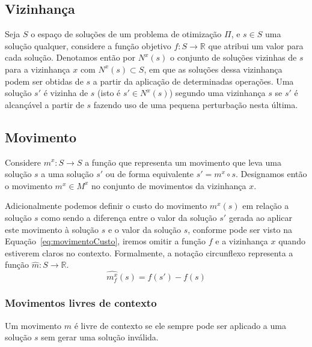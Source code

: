 \subsection{Vizinhança} \label{subsec:vizinhanca}

Seja $S$ o espaço de soluções de um problema de otimização $\Pi$, e $s \in S$ uma solução qualquer, considere a função objetivo $f: S \rightarrow \mathbb{R}$ que atribui um valor para cada solução.
Denotamos então por $N^x(s)$ o conjunto de soluções vizinhas de $s$ para a vizinhança $x$ com $N^x(s) \subset S$, em que as soluções dessa vizinhança podem ser obtidas de $s$ a partir da aplicação de determinadas operações.
Uma solução $s'$ é vizinha de $s$ (isto é $s' \in N^x(s)$) segundo uma vizinhança $s$ se $s'$ é alcançável a partir de $s$ fazendo uso de uma pequena perturbação nesta última.

\subsection{Movimento} \label{subsec:movimento}

Considere $m^x: S \rightarrow S$ a função que representa um movimento que leva uma solução $s$ a uma solução $s'$ ou de forma equivalente $s' = m^x \circ s$.
Designamos então o movimento $m^x \in M^x$ no conjunto de movimentos da vizinhança $x$.

Adicionalmente podemos definir o custo do movimento $m^x(s)$ em relação a solução $s$ como sendo a diferença entre o valor da solução $s'$ gerada ao aplicar este movimento à solução $s$ e o valor da solução $s$, conforme pode ser visto na Equação~\ref{eq:movimentoCusto}, iremos omitir a função $f$ e a vizinhança $x$ quando estiverem claros no contexto. Formalmente, a notação circunflexo representa a função $\widehat{m}: S \rightarrow \mathbb{R}$.
\begin{equation} \label{eq:movimentoCusto}
\widehat{m^x_f}(s) = f(s') - f(s)
\end{equation}

\subsubsection{Movimentos livres de contexto} \label{subsubsec:movimentosLivresDeContexto}

Um movimento $m$ é livre de contexto se ele sempre pode ser aplicado a uma solução $s$ sem gerar uma solução inválida.


